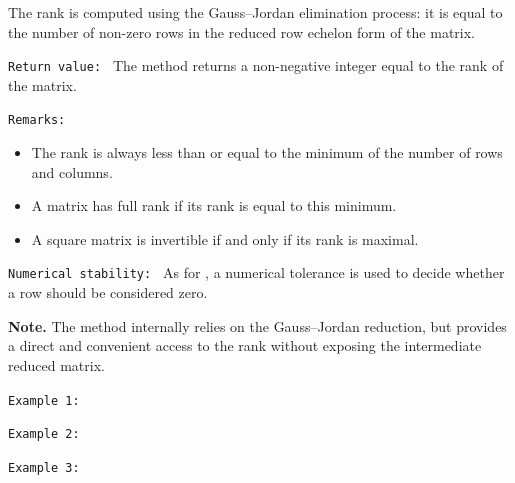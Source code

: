 \medskip
The rank is computed using the Gauss–Jordan elimination process: it is equal to the number of non-zero rows in the reduced row echelon form of the matrix.

\medskip
\texttt{Return value: }
The method returns a non-negative integer equal to the rank of the matrix.

\medskip
\texttt{Remarks: }
\begin{itemize}
\item The rank is always less than or equal to the minimum of the number of rows and columns.
\item A matrix has full rank if its rank is equal to this minimum.
\item A square matrix is invertible if and only if its rank is maximal.
\end{itemize}

\medskip
\texttt{Numerical stability: }
As for , a numerical tolerance is used to decide whether a row should be considered zero.

\medskip
\noindent
\textbf{Note.}
The method  internally relies on the Gauss–Jordan reduction, but provides a direct and convenient access to the rank without exposing the intermediate reduced matrix.

\texttt{Example 1: }

\begin{tkzexample}[latex=.5\textwidth]
\end{tkzexample}

\texttt{Example 2: }

\begin{tkzexample}[latex=.5\textwidth]
\end{tkzexample}

\texttt{Example 3: }

\begin{tkzexample}[latex=.5\textwidth]


\end{tkzexample}


